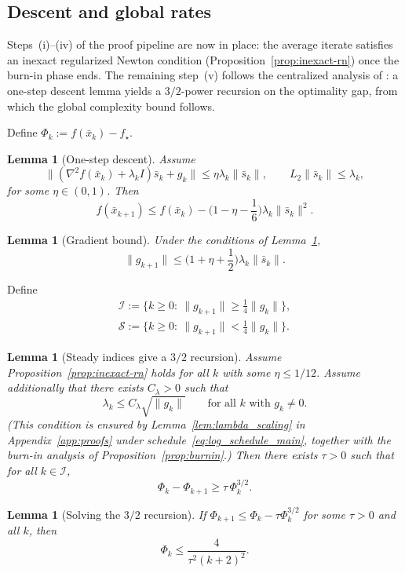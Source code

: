 \documentclass[11pt,a4paper]{article}
\newtheorem{lemma}[theorem]{Lemma}
\begin{document}
\subsection{Descent and global rates}\label{ssec:descent}
Steps~(i)--(iv) of the proof pipeline are now in place: the average
iterate satisfies an inexact regularized Newton condition
(Proposition~\ref{prop:inexact-rn}) once the burn-in phase ends.
The remaining step~(v) follows the centralized analysis of
\citet{mishchenko2023rn}: a one-step descent lemma yields a
$3/2$-power recursion on the optimality gap, from which the global
complexity bound follows.

Define $\Phi_k:=f(\bar x_k)-f_\star$.

\begin{lemma}[One-step descent]\label{lem:descent}
Assume
\[
\|(\nabla^2 f(\bar x_k)+\lambda_k I)\bar s_k+g_k\|\le \eta\lambda_k\|\bar s_k\|,
\qquad
L_2\|\bar s_k\|\le \lambda_k,
\]
for some $\eta\in(0,1)$.
Then
\[
f(\bar x_{k+1})\le f(\bar x_k) - \Big(1-\eta-\frac{1}{6}\Big)\lambda_k\|\bar s_k\|^2.
\]
\end{lemma}

\begin{lemma}[Gradient bound]\label{lem:grad_bound}
Under the conditions of Lemma~\ref{lem:descent},
\[
\|g_{k+1}\|\le \Big(1+\eta+\frac{1}{2}\Big)\lambda_k\|\bar s_k\|.
\]
\end{lemma}

Define
\begin{gather*}
\mathcal I:=\{k\ge0:\ \|g_{k+1}\|\ge \tfrac14\|g_k\|\},\\
\mathcal S:=\{k\ge0:\ \|g_{k+1}\|< \tfrac14\|g_k\|\}.
\end{gather*}

\begin{lemma}[Steady indices give a $3/2$ recursion]\label{lem:steady}
Assume Proposition~\ref{prop:inexact-rn} holds for all $k$ with some $\eta\le 1/12$.
Assume additionally that there exists $C_\lambda>0$ such that
\[
\lambda_k\le C_\lambda\sqrt{\|g_k\|}\qquad\text{for all $k$ with $g_k\neq 0$}.
\]
(This condition is ensured by Lemma~\ref{lem:lambda_scaling}
in Appendix~\ref{app:proofs} under
schedule~\eqref{eq:log_schedule_main}, together with the burn-in
analysis of Proposition~\ref{prop:burnin}.)
Then there exists $\tau>0$ such that for all $k\in\mathcal I$,
\[
\Phi_k-\Phi_{k+1}\ge \tau\,\Phi_k^{3/2}.
\]
\end{lemma}

\begin{lemma}[Solving the $3/2$ recursion]\label{lem:solve32}
If $\Phi_{k+1}\le \Phi_k-\tau\Phi_k^{3/2}$ for some $\tau>0$ and all $k$, then
\[
\Phi_k\le \frac{4}{\tau^2(k+2)^2}.
\]
\end{lemma}
\end{document}
